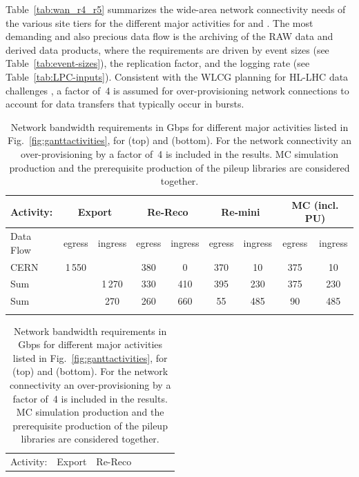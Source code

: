Table~\ref{tab:wan_r4_r5} summarizes the wide-area network connectivity needs of the various site tiers for the different major activities for \RunFour and \RunFive. The most demanding and also precious data flow is the archiving of the \gls{RAW} data and derived data products, where the requirements are driven by event sizes (see Table~\ref{tab:event-sizes}), the replication factor, and the logging rate (see Table~\ref{tab:LPC-inputs}). Consistent with the \gls{WLCG} planning for \gls{HL-LHC} data challenges \cite{campana_simone_2021_5532452}, a factor of~4 is assumed for over-provisioning network connections to account for data transfers that typically occur in bursts.


\begin{table}[tbph]
	\centering
	\caption{Network bandwidth requirements in Gbps for different major activities listed in Fig.~\ref{fig:ganttactivities}, for \RunFour (top) and \RunFive (bottom). For the network connectivity an over-provisioning by a factor of~4 is included in the results. \gls{MC} simulation production and the prerequisite production of the pileup libraries are considered together.}
	\begin{tabular}{|l|c|c|c|c|c|c|c|c|}
	\hline
	\rowcolor{tableheader}  Activity: & \multicolumn{2}{c|}{\TierZero Export} & \multicolumn{2}{c|}{Re-Reco} 
	                                & \multicolumn{2}{c|}{Re-mini}       & \multicolumn{2}{c|}{MC (incl. PU)} \\ \hline
	\rowcolor{tableheader}  Data Flow        & egress & ingress & egress & ingress & egress & ingress & egress & ingress \\ \hline    
	\cellcolor{tablerowheader}  CERN         & 1\,550 &         &  380   &  0      & 370    & 10      & 375    &  10 \\ \hline
	\cellcolor{tablerowheader}  Sum \TierOne &        & 1\,270  &  330   & 410     & 395    & 230     & 375    &  230 \\ \hline
	\cellcolor{tablerowheader}  Sum \TierTwo &        & 270     &  260   & 660     & 55     & 485     &  90    & 485 \\ \hline 
	\multicolumn{9}{c}{}\\
	\end{tabular}
	\begin{tabular}{|l|c|c|c|c|c|c|c|c|}
	\hline
	\rowcolor{tableheader}  Activity: & \multicolumn{2}{c|}{\TierZero Export} & \multicolumn{2}{c|}{Re-Reco} 

\end{tabular}
\end{table}
